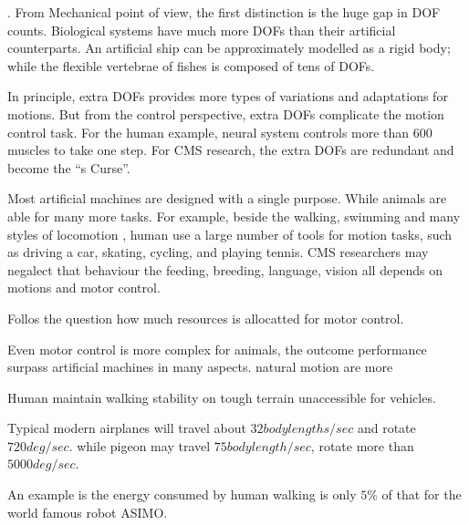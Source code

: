 \begin{itemize}
.
From Mechanical point of view, the first distinction is the huge gap in DOF counts. 
Biological systems have much more DOFs than their artificial counterparts.
An artificial ship can be approximately modelled as a rigid body; while the flexible vertebrae of fishes is composed of tens of DOFs.


In principle, extra DOFs provides more types of variations and adaptations for motions. 
But from the control perspective, extra DOFs complicate the motion control task. 
For the human example, neural system controls more than 600 muscles to take one step.
For CMS research, the extra DOFs are redundant and become the ``{\dof}s Curse''.
 
Most artificial machines are designed with a single purpose.
While animals are able  for many more tasks.
For example, beside the walking, swimming and many styles of locomotion , human  use a large number of tools for motion tasks, such as driving a car, skating, cycling, and playing tennis.
CMS researchers may negalect that behaviour the feeding, breeding, language, vision all depends on motions and motor control. 

Follos the question how much resources is allocatted for motor control.

Even motor control is more complex for animals, the outcome performance surpass artificial machines in many aspects.
natural motion are more
\begin{enumerate} 

Human maintain walking stability on tough terrain unaccessible for vehicles.

Typical modern airplanes will travel about $32 body lengths/sec$ and rotate $720 deg/sec$.
while pigeon may travel $75 body length / sec$, rotate more than $5000deg/sec$.

An example is the energy consumed by human walking is only $5\%$ of that for the world famous robot ASIMO.
\end{enumerate}

\end{itemize}




